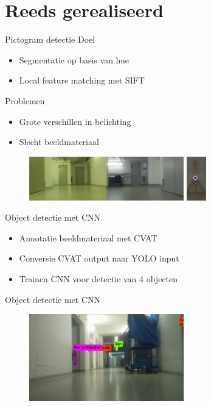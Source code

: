 \documentclass[11pt,t]{beamer}
\begin{document}
\section{Reeds gerealiseerd}
\begin{frame}[fragile]{Pictogram detectie}
	Doel
	\begin{itemize}
		\item Segmentatie op basis van hue
		\item Local feature matching met SIFT
	\end{itemize}

	Problemen
	\begin{itemize}
		\item Grote verschillen in belichting
		\item Slecht beeldmateriaal
	\end{itemize}

	\begin{figure}
		\centering
		\includegraphics[width=0.6\textwidth]{graphics/kleurverschil.png}
		\includegraphics{graphics/sift_detectie.png}
		\flushleft
	\end{figure}
\end{frame}

\begin{frame}[fragile]{Object detectie met CNN}
	\begin{itemize}
		\item Annotatie beeldmateriaal met CVAT
		\item Conversie CVAT output naar YOLO input
		\item Trainen CNN voor detectie van 4 objecten
	\end{itemize}
\end{frame}

\begin{frame}[fragile]{Object detectie met CNN}
	\begin{figure}
		\centering
		\includegraphics[width=0.6\textwidth]{graphics/yolo_detectie1.jpg}
		\flushleft
	\end{figure}
\end{frame}
\end{document}
